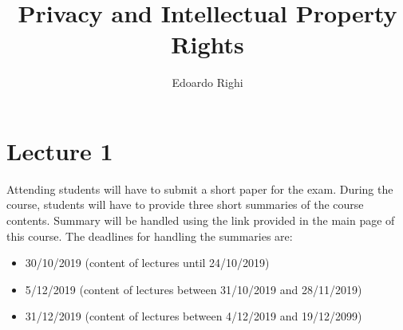 \documentclass[a4paper, 10pt, titlepage]{article}
\begin{document}
\title{Privacy and Intellectual Property Rights}
\author{Edoardo Righi}
\maketitle
\section{Lecture 1}
Attending students will have to submit a short paper for the exam.
During the course, students will have to provide three short summaries of the course contents. Summary will be handled using the link provided in the main page of this course. The deadlines for handling the summaries are:
\begin{itemize}
\item 30/10/2019 (content of lectures until 24/10/2019)
\item 5/12/2019 (content of lectures between 31/10/2019 and 28/11/2019)
\item 31/12/2019 (content of lectures between 4/12/2019 and 19/12/2099)
\end{itemize}
\end{document}
